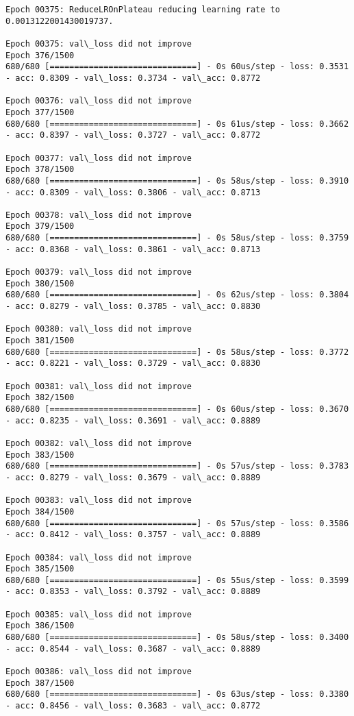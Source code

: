 \documentclass[11pt]{article}
\begin{document}
\begin{Verbatim}[commandchars=\\\{\}]
Epoch 00375: ReduceLROnPlateau reducing learning rate to 0.0013122001430019737.

Epoch 00375: val\_loss did not improve
Epoch 376/1500
680/680 [==============================] - 0s 60us/step - loss: 0.3531 - acc: 0.8309 - val\_loss: 0.3734 - val\_acc: 0.8772

Epoch 00376: val\_loss did not improve
Epoch 377/1500
680/680 [==============================] - 0s 61us/step - loss: 0.3662 - acc: 0.8397 - val\_loss: 0.3727 - val\_acc: 0.8772

Epoch 00377: val\_loss did not improve
Epoch 378/1500
680/680 [==============================] - 0s 58us/step - loss: 0.3910 - acc: 0.8309 - val\_loss: 0.3806 - val\_acc: 0.8713

Epoch 00378: val\_loss did not improve
Epoch 379/1500
680/680 [==============================] - 0s 58us/step - loss: 0.3759 - acc: 0.8368 - val\_loss: 0.3861 - val\_acc: 0.8713

Epoch 00379: val\_loss did not improve
Epoch 380/1500
680/680 [==============================] - 0s 62us/step - loss: 0.3804 - acc: 0.8279 - val\_loss: 0.3785 - val\_acc: 0.8830

Epoch 00380: val\_loss did not improve
Epoch 381/1500
680/680 [==============================] - 0s 58us/step - loss: 0.3772 - acc: 0.8221 - val\_loss: 0.3729 - val\_acc: 0.8830

Epoch 00381: val\_loss did not improve
Epoch 382/1500
680/680 [==============================] - 0s 60us/step - loss: 0.3670 - acc: 0.8235 - val\_loss: 0.3691 - val\_acc: 0.8889

Epoch 00382: val\_loss did not improve
Epoch 383/1500
680/680 [==============================] - 0s 57us/step - loss: 0.3783 - acc: 0.8279 - val\_loss: 0.3679 - val\_acc: 0.8889

Epoch 00383: val\_loss did not improve
Epoch 384/1500
680/680 [==============================] - 0s 57us/step - loss: 0.3586 - acc: 0.8412 - val\_loss: 0.3757 - val\_acc: 0.8889

Epoch 00384: val\_loss did not improve
Epoch 385/1500
680/680 [==============================] - 0s 55us/step - loss: 0.3599 - acc: 0.8353 - val\_loss: 0.3792 - val\_acc: 0.8889

Epoch 00385: val\_loss did not improve
Epoch 386/1500
680/680 [==============================] - 0s 58us/step - loss: 0.3400 - acc: 0.8544 - val\_loss: 0.3687 - val\_acc: 0.8889

Epoch 00386: val\_loss did not improve
Epoch 387/1500
680/680 [==============================] - 0s 63us/step - loss: 0.3380 - acc: 0.8456 - val\_loss: 0.3683 - val\_acc: 0.8772


\end{Verbatim}
\end{document}
